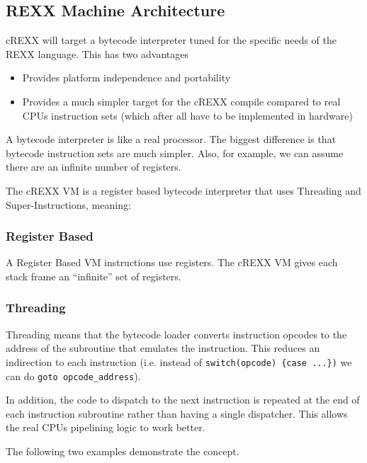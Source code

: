 \subsection{REXX Machine Architecture}

cREXX will target a bytecode interpreter tuned for the specific needs of
the REXX language. This has two advantages

\begin{itemize}
\item Provides platform independence and portability

\item Provides a much simpler target for the cREXX compile compared to real CPU\textquotesingle{}s
instruction sets (which after all have to be implemented in hardware)

\end{itemize}

A bytecode interpreter is like a real processor. The biggest difference is
that bytecode instruction sets are much simpler. Also, for example, we can
assume there are an infinite number of registers.

The cREXX VM is a register based bytecode interpreter that uses Threading
and Super-Instructions, meaning:

\subsubsection{Register Based}

A Register Based VM instructions use registers. The cREXX VM gives each
stack frame an ``infinite'' set of registers.

\subsubsection{Threading}

Threading means that the \textquotedbl{}bytecode\textquotedbl{} loader converts instruction opcodes to
the address of the subroutine that emulates the instruction. This reduces
an indirection to each instruction (i.e. instead of
\texttt{switch(opcode) \{case ...\})} we can do \texttt{goto opcode\_address}).

In addition, the code to dispatch to the next instruction is repeated at the
end of each instruction subroutine rather than having a single dispatcher.
This allows the real CPU\textquotesingle{}s pipelining logic to work better.

The following two examples demonstrate the concept.

